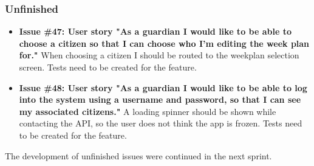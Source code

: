 \subsubsection{Unfinished}
\begin{itemize}
    \item \textbf{Issue \#47: User story "As a guardian I would like to be able to choose a citizen so that I can choose who I’m editing the week plan for."}
    \subitem When  choosing  a  citizen  I  should  be  routed  to  the  weekplan selection  screen.
    \subitem Tests need to be created for the feature.
    
    \item \textbf{Issue \#48: User story "As a guardian I would like to be able to log into the system using a username and password, so that I can see my associated citizens."}
    \subitem A loading spinner should be shown while contacting the API, so the user does not think the app is frozen.
    \subitem Tests need to be created for the feature.
\end{itemize}

The development of unfinished issues were continued in the next sprint. 
